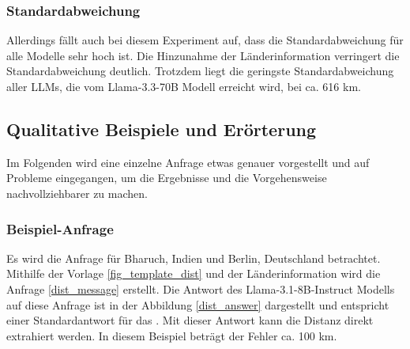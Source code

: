 \subsubsection*{Standardabweichung}
Allerdings fällt auch bei diesem Experiment auf, dass die Standardabweichung für alle Modelle sehr hoch ist.
Die Hinzunahme der Länderinformation verringert die Standardabweichung deutlich.
Trotzdem liegt die geringste Standardabweichung aller LLMs, die vom Llama-3.3-70B Modell erreicht wird, bei ca. 616 km.

\subsection{Qualitative Beispiele und Erörterung}
Im Folgenden wird eine einzelne Anfrage etwas genauer vorgestellt und auf Probleme eingegangen, um die Ergebnisse und die Vorgehensweise nachvollziehbarer zu machen.

\subsubsection*{Beispiel-Anfrage}
Es wird die Anfrage für Bharuch, Indien und Berlin, Deutschland betrachtet.
Mithilfe der Vorlage \ref{fig_template_dist} und der Länderinformation wird die Anfrage \ref{dist_message} erstellt.
Die Antwort des Llama-3.1-8B-Instruct Modells auf diese Anfrage ist in der Abbildung \ref{dist_answer} dargestellt und entspricht einer Standardantwort für das \jsonv{}.
Mit dieser Antwort kann die Distanz direkt extrahiert werden.
In diesem Beispiel beträgt der Fehler ca. 100 km.

